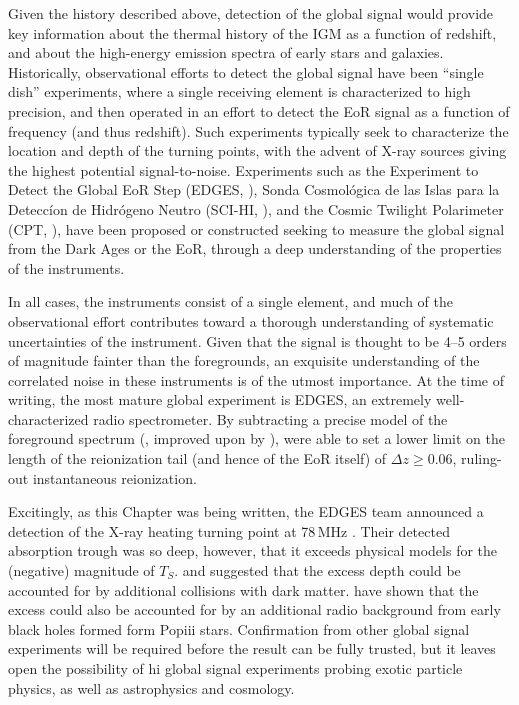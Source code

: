 Given the history described above, detection of the global signal would provide key information about the thermal history of the IGM as a function of redshift, and about the high-energy emission spectra of early stars and galaxies. Historically, observational efforts to detect the global signal have been ``single dish'' experiments, where a single receiving element is characterized to high precision, and then operated in an effort to detect the EoR signal as a function of frequency (and thus redshift). Such experiments typically seek to characterize the location and depth of the turning points, with the advent of X-ray sources giving the highest potential signal-to-noise. Experiments such as the Experiment to Detect the Global EoR Step (EDGES, \citealt{Bowman.10}), Sonda Cosmol\'{o}gica de las Islas para la Detecc\'{i}on de Hidr\'{o}geno Neutro (SCI-HI, \citealt{Voytek.14}), and the Cosmic Twilight Polarimeter (CPT, \citealt{Nhan.16}), have been proposed or constructed seeking to measure the global signal from the Dark Ages or the EoR, through a deep understanding of the properties of the instruments.

In all cases, the instruments consist of a single element, and much of the observational effort contributes toward a thorough understanding of systematic uncertainties of the instrument. Given that the signal is thought to be 4--5 orders of magnitude fainter than the foregrounds, an exquisite understanding of the correlated noise in these instruments is of the utmost importance. At the time of writing, the most mature global experiment is EDGES, an extremely well-characterized radio spectrometer. By subtracting a precise model of the foreground spectrum (\citealt{Rogers.08}, improved upon by \citealt{Mozden.17}), \cite{Bowman.10} were able to set a lower limit on the length of the reionization tail (and hence of the EoR itself) of  $\Delta z \geq 0.06$, ruling-out instantaneous reionization.

Excitingly, as this Chapter was being written, the EDGES team announced a detection of the X-ray heating turning point at 78\,MHz \citep{Bowman.18}. Their detected absorption trough was so deep, however, that it exceeds physical models for the (negative) magnitude of $T_S$. \cite{Bowman.18} and \cite{Barkana.18} suggested that the excess depth could be accounted for by additional collisions with dark matter. \cite{Ewall-Wice.18.edges} have shown that the excess could also be accounted for by an additional radio background from early black holes formed form Pop{\sc iii} stars. Confirmation from other global signal experiments will be required before the \cite{Bowman.18} result can be fully trusted, but it leaves open the possibility of {\sc hi} global signal experiments probing exotic particle physics, as well as astrophysics and cosmology.

